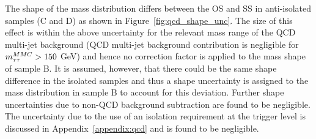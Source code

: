 

The shape of the \mmc mass distribution differs between the OS and SS in 
anti-isolated samples (C and D) as shown in Figure~\ref{fig:qcd_shape_unc}.
The size of this effect is within the above \rqcd uncertainty for the  relevant mass range of the QCD multi-jet background (QCD multi-jet background
contribution is negligible for $m_{\tau\tau}^{MMC}  > 150$ GeV) and hence no correction factor is applied to the mass shape of sample B. 
It is assumed, however, that there could be the same 
shape difference in the isolated samples and thus a shape uncertainty is  assigned to the mass distribution in 
sample B to account for this  deviation. Further 
shape uncertainties due to non-QCD background subtraction are found to be negligible. The uncertainty due to the use of an isolation 
requirement at the trigger level is discussed in Appendix~\ref{appendix:qcd} and is found to be negligible.



